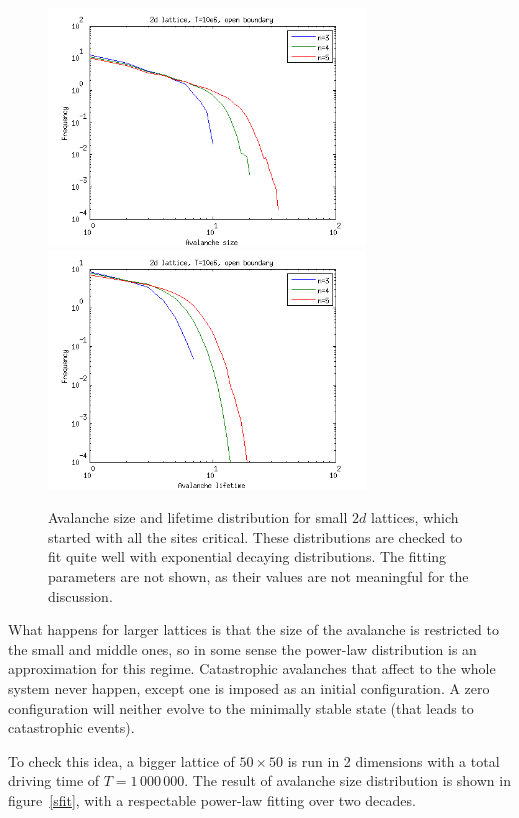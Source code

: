 \begin{figure}
\begin{center}
\includegraphics[width=0.75\textwidth]{results/smulti.png}
\includegraphics[width=0.75\textwidth]{results/tmulti.png}
\caption{Avalanche size and lifetime distribution for small $2d$ lattices,
which started with all the sites critical.
These distributions are checked to fit quite well with exponential decaying distributions. The fitting parameters are not shown, as their values are not meaningful for the discussion.}
\label{multi}
\end{center}
\end{figure}

What happens for larger lattices is that the size of the avalanche is restricted to the small and middle ones, so in some sense the power-law distribution is an approximation for this regime. Catastrophic avalanches that affect to the whole system never happen, except one is imposed as an initial configuration.
A zero configuration will neither evolve to the minimally stable state (that leads to catastrophic events).

To check this idea, a bigger lattice of $50\times 50$ is run in 2 dimensions with a total driving time of $T=1\,000\,000$.
The result of avalanche size distribution is shown in figure~\ref{sfit}, with a respectable power-law fitting over two decades.

